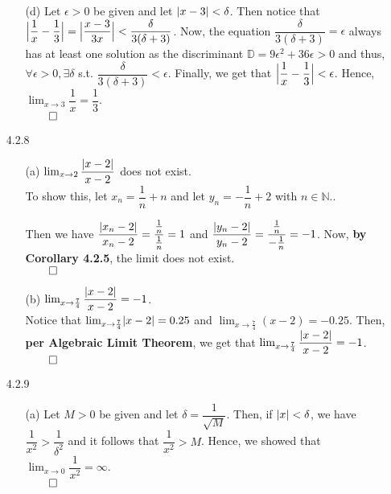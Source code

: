 \documentclass[11pt]{article}
\DeclarePairedDelimiter\abs{\lvert}{\rvert}%
\DeclarePairedDelimiter\absb{\Big\lvert}{\Big\rvert}%
\newcommand{\nats}{\mathbb{N}}
\begin{document}
\begin{itemize}
\begin{itemize}
            \item[(d)]
                Let $\epsilon > 0$ be given and let $\abs{x - 3} < \delta$.
                Then notice that $\absb{\dfrac{1}{x} - \dfrac{1}{3}} =
                \absb{\dfrac{x - 3}{3x}} < \dfrac{\delta}{3(\delta + 3)}$. Now,
                the equation $\dfrac{\delta}{3(\delta + 3)} = \epsilon$ always
                has at least one solution as the discriminant $\mathbb{D} =
                9\epsilon^2 + 36 \epsilon > 0$ and thus, $\forall \epsilon > 0,
                \exists \delta$ s.t. $\dfrac{\delta}{3(\delta + 3)} <
                \epsilon$. Finally, we get that $\absb{\dfrac{1}{x} -
                \dfrac{1}{3}} < \epsilon$.  Hence, $\lim_{x \to 3} \dfrac{1}{x}
                = \dfrac{1}{3}$.\\
                $\qed$
                
        \end{itemize}

    \item[4.2.8]
        \begin{itemize}
            \item[(a)]
                $\lim_{x \to 2} \dfrac{\abs{x - 2}}{x - 2}$ does not exist.
                \\
                To show this, let $x_n = \dfrac{1}{n} + n$ and let $y_n =
                -\dfrac{1}{n} + 2$ with $n \in \nats$..

                Then we have $\dfrac{\abs{x_n - 2}}{x_n - 2} =
                \dfrac{\frac{1}{n}}{\frac{1}{n}} = 1$ and $\dfrac{\abs{y_n -
                2}}{y_n - 2} = \dfrac{\frac{1}{n}}{-\frac{1}{n}} = -1$.
                Now, \textbf{by Corollary 4.2.5}, the limit does not exist.\\
                $\qed$

            \item[(b)]
                $\lim_{x \to \frac{7}{4}} \dfrac{\abs{x - 2}}{x - 2} = -1$.
                \\
                Notice that $\lim_{x \to \frac{7}{4}} \abs{x - 2} = 0.25$ and
                $\lim_{x \to \frac{7}{4}} (x - 2) = -0.25$. Then, \textbf{per
                Algebraic Limit Theorem}, we get that $\lim_{x \to \frac{7}{4}}
                \dfrac{\abs{x - 2}}{x - 2} = -1$.\\
                $\qed$
        \end{itemize}

    \newpage

    \item[4.2.9]
        \begin{itemize}
            \item[(a)]
                Let $M > 0$ be given and let $\delta = \dfrac{1}{\sqrt{M}}$.
                Then, if $\abs{x} < \delta$, we have $\dfrac{1}{x^2} >
                \dfrac{1}{\delta^2}$ and it follows that $\dfrac{1}{x^2} > M$.
                Hence, we showed that $\lim_{x \to 0} \dfrac{1}{x^2} =
                \infty$.\\
                $\qed$


\end{itemize}
\end{itemize}
\end{document}
